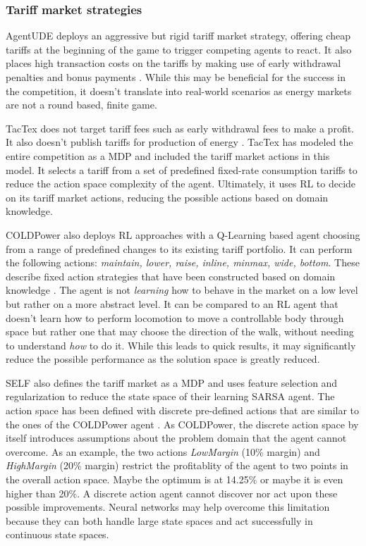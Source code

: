 \subsubsection{Tariff market strategies}%
\label{ssub:tariff_market_strategies}

AgentUDE deploys an aggressive but rigid tariff market strategy, offering cheap tariffs at the beginning of the game to
trigger competing agents to react. It also places high transaction costs on the tariffs by making use of early
withdrawal penalties and bonus payments \citep{ozdemir2017strategy}. While this may be beneficial for the success in the
competition, it doesn't translate into real-world scenarios as energy markets are not a round based, finite game.

TacTex does not target tariff fees such as early withdrawal fees to make a profit. It also doesn't publish tariffs for
production of energy \citep{tactexurieli2016mdp}. TacTex has modeled the entire competition as a \ac{MDP} and included the
tariff market actions in this model. It selects a tariff from a set of predefined fixed-rate consumption tariffs to
reduce the action space complexity of the agent. Ultimately, it uses \ac{RL} to decide on its tariff market
actions, reducing the possible actions based on domain knowledge.

COLDPower also deploys \ac{RL} approaches with a Q-Learning based agent choosing from a range of predefined changes to
its existing tariff portfolio. It can perform the following actions: \emph{maintain, lower, raise, inline, minmax, wide,
bottom}. These describe fixed action strategies that have been constructed based on domain knowledge \citep{cuevas2015distributed}. The agent
is not \emph{learning} how to behave in the market on a low level but rather on a more abstract level. It can be
compared to an \ac{RL} agent that doesn't learn how to perform locomotion to move a controllable body through space but
rather one that may choose the direction of the walk, without needing to understand \emph{how} to do it. While this
leads to quick results, it may significantly reduce the possible performance as the solution space is greatly reduced.

\ac{SELF} also defines the tariff market as a \ac{MDP} and uses feature selection and regularization to reduce the state
space of their learning \ac{SARSA} agent. The action space has been defined with discrete pre-defined actions that are
similar to the ones of the COLDPower agent \citep{peters2013reinforcement}. As COLDPower, the discrete action space by itself introduces assumptions about
the problem domain that the agent cannot overcome. As an example, the two actions \emph{LowMargin} (10\% margin) and
\emph{HighMargin} (20\% margin) restrict the profitablity of the agent to two points in the overall action space. Maybe
the optimum is at 14.25\% or maybe it is even higher than 20\%. A discrete action agent cannot discover nor act upon
these possible improvements. Neural networks may help overcome this limitation because they can both handle large state spaces
and act successfully in continuous state spaces.



